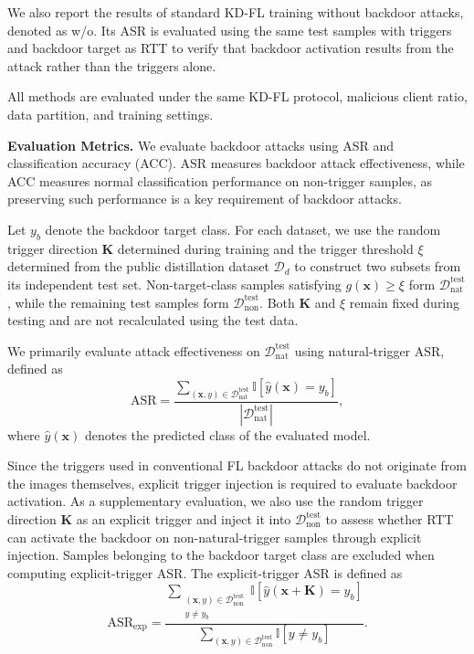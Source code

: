 \documentclass[lettersize,journal]{IEEEtran}
\newif\ifhighlight
\newcommand{\hlone}[1]{%
    \ifhighlight{\color{reviewer1}#1}\else#1\fi
}
\newcommand{\hlshare}[1]{%
    \ifhighlight{\color{share}#1}\else#1\fi
}
\begin{document}
We also report the results of standard KD-FL training without backdoor attacks, denoted as w/o. 
\hlone{Its ASR is evaluated using the same test samples with triggers and backdoor target as RTT to verify that backdoor activation results from the attack rather than the triggers alone.}
All methods are evaluated under the same KD-FL protocol, malicious client ratio, data partition, and training settings.

\textbf{Evaluation Metrics.} \hlone{We evaluate backdoor attacks using ASR and classification accuracy (ACC).
ASR measures backdoor attack effectiveness, while ACC measures normal classification performance on non-trigger samples, as preserving such performance is a key requirement of backdoor attacks.}

\hlshare{
Let $y_b$ denote the backdoor target class.
For each dataset, we use the random trigger direction $\mathbf{K}$ determined during training and the trigger threshold $\xi$ determined from the public distillation dataset $\mathcal{D}_d$ to construct two subsets from its independent test set.
Non-target-class samples satisfying $g(\mathbf{x}) \geq \xi$ form $\mathcal{D}_{\mathrm{nat}}^{\mathrm{test}}$, while the remaining test samples form $\mathcal{D}_{\mathrm{non}}^{\mathrm{test}}$.
Both $\mathbf{K}$ and $\xi$ remain fixed during testing and are not recalculated using the test data.

We primarily evaluate attack effectiveness on $\mathcal{D}_{\mathrm{nat}}^{\mathrm{test}}$ using natural-trigger ASR, defined as
\begin{equation}
\mathrm{ASR}
=
\frac{
\sum_{(\mathbf{x},y)\in\mathcal{D}_{\mathrm{nat}}^{\mathrm{test}}}
\mathbb{I}[\hat{y}(\mathbf{x})=y_b]
}{
|\mathcal{D}_{\mathrm{nat}}^{\mathrm{test}}|
},
\end{equation}
where $\hat{y}(\mathbf{x})$ denotes the predicted class of the evaluated model.

Since the triggers used in conventional FL backdoor attacks do not originate from the images themselves, explicit trigger injection is required to evaluate backdoor activation.
As a supplementary evaluation, we also use the random trigger direction $\mathbf{K}$ as an explicit trigger and inject it into $\mathcal{D}_{\mathrm{non}}^{\mathrm{test}}$ to assess whether RTT can activate the backdoor on non-natural-trigger samples through explicit injection.
Samples belonging to the backdoor target class are excluded when computing explicit-trigger ASR.
The explicit-trigger ASR is defined as
\begin{equation}
\mathrm{ASR}_{\mathrm{exp}}
=
\frac{
\sum_{\substack{
(\mathbf{x},y)\in\mathcal{D}_{\mathrm{non}}^{\mathrm{test}}\\
y\neq y_b
}}
\mathbb{I}[
\hat{y}(\mathbf{x}+\mathbf{K})=y_b
]
}{
\sum_{(\mathbf{x},y)\in\mathcal{D}_{\mathrm{non}}^{\mathrm{test}}}
\mathbb{I}[y\neq y_b]
}.
\end{equation}

}
\end{document}
